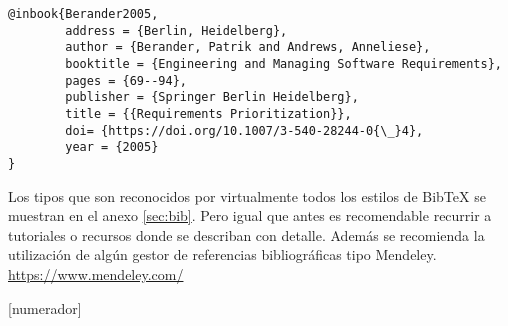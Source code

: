  \begin{verbatim}
@inbook{Berander2005,
        address = {Berlin, Heidelberg},
        author = {Berander, Patrik and Andrews, Anneliese},
        booktitle = {Engineering and Managing Software Requirements},
        pages = {69--94},
        publisher = {Springer Berlin Heidelberg},
        title = {{Requirements Prioritization}},
        doi= {https://doi.org/10.1007/3-540-28244-0{\_}4},
        year = {2005}
} 
 \end{verbatim}
 
 Los tipos que son reconocidos por virtualmente todos los estilos de BibTeX se muestran en el anexo \ref{sec:bib}. Pero igual que antes es recomendable recurrir a tutoriales o recursos donde se describan con detalle. Además se recomienda la utilización de algún gestor de referencias bibliográficas tipo Mendeley. \url{https://www.mendeley.com/}
 
[numerador]



